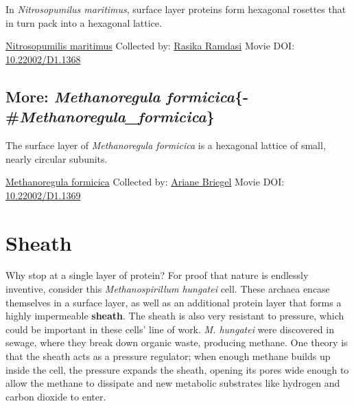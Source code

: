 \documentclass[]{tufte-book}
\begin{document}
In \emph{Nitrosopumilus maritimus}, surface layer proteins form hexagonal rosettes that in turn pack into a hexagonal lattice.



\hypertarget{htmlwidget-fb1b19be7471229119fc}{}

\label{fig:2-7c}\protect\hyperlink{tree}{Nitrosopumilis maritimus} Collected by: \protect\hyperlink{rasika_ramdasi}{Rasika Ramdasi} Movie DOI: \href{https://doi.org/10.22002/D1.1368}{10.22002/D1.1368}

\hypertarget{more-methanoregula-formicica-methanoregula_formicica}{%
\subsection{\texorpdfstring{More: \emph{Methanoregula formicica}\{-\#\emph{Methanoregula\_formicica}\}}{More: Methanoregula formicica\{-\#Methanoregula\_formicica\}}}\label{more-methanoregula-formicica-methanoregula_formicica}}

The surface layer of \emph{Methanoregula formicica} is a hexagonal lattice of small, nearly circular subunits.



\hypertarget{htmlwidget-f01213f5d0e5dce9b083}{}

\label{fig:2-7d}\protect\hyperlink{tree}{Methanoregula formicica} Collected by: \protect\hyperlink{ariane_briegel}{Ariane Briegel} Movie DOI: \href{https://doi.org/10.22002/D1.1369}{10.22002/D1.1369}

\hypertarget{sheath}{%
\section{Sheath}\label{sheath}}

Why stop at a single layer of protein? For proof that nature is endlessly inventive, consider this \emph{Methanospirillum hungatei} cell. These archaea encase themselves in a surface layer, as well as an additional protein layer that forms a highly impermeable \textbf{sheath}. The sheath is also very resistant to pressure, which could be important in these cells' line of work. \emph{M. hungatei} were discovered in sewage, where they break down organic waste, producing methane. One theory is that the sheath acts as a pressure regulator; when enough methane builds up inside the cell, the pressure expands the sheath, opening its pores wide enough to allow the methane to dissipate and new metabolic substrates like hydrogen and carbon dioxide to enter.
\end{document}
